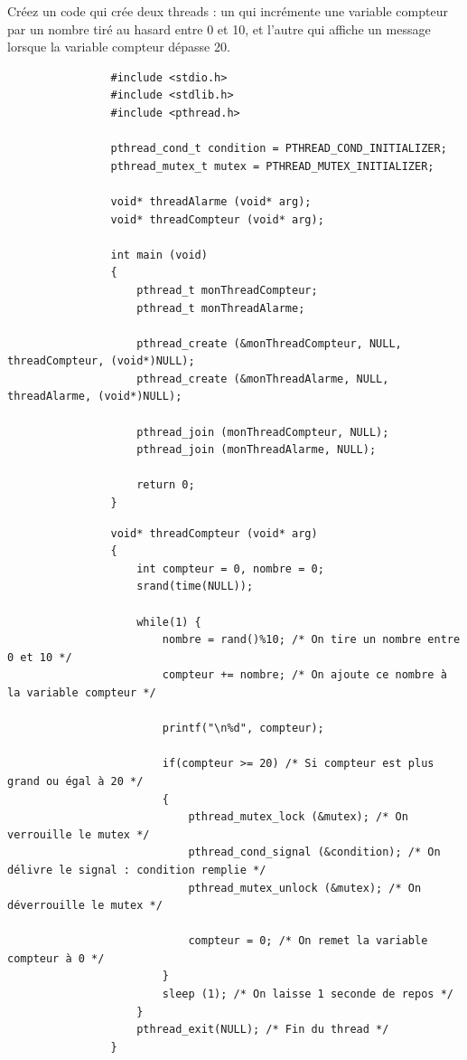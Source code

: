 		\begin{frame}
			Créez un code qui crée deux threads : un qui incrémente une variable compteur par un nombre tiré au hasard entre 0 et 10, et l'autre qui affiche un message lorsque la variable compteur dépasse 20.
		\end{frame} 
		
		\begin{frame}[containsverbatim]
			\begin{lstlisting}
				#include <stdio.h>
				#include <stdlib.h>
				#include <pthread.h>

				pthread_cond_t condition = PTHREAD_COND_INITIALIZER;
				pthread_mutex_t mutex = PTHREAD_MUTEX_INITIALIZER;

				void* threadAlarme (void* arg);
				void* threadCompteur (void* arg);

				int main (void)
				{
					pthread_t monThreadCompteur;
					pthread_t monThreadAlarme;

					pthread_create (&monThreadCompteur, NULL, threadCompteur, (void*)NULL);
					pthread_create (&monThreadAlarme, NULL, threadAlarme, (void*)NULL);

					pthread_join (monThreadCompteur, NULL);
					pthread_join (monThreadAlarme, NULL);

					return 0;
				}
			\end{lstlisting}
		\end{frame}
		
		\begin{frame}[containsverbatim]
			\begin{lstlisting}
				void* threadCompteur (void* arg)
				{
					int compteur = 0, nombre = 0;
					srand(time(NULL));

					while(1) {
						nombre = rand()%10; /* On tire un nombre entre 0 et 10 */
						compteur += nombre; /* On ajoute ce nombre à la variable compteur */

						printf("\n%d", compteur);
						
						if(compteur >= 20) /* Si compteur est plus grand ou égal à 20 */
						{
							pthread_mutex_lock (&mutex); /* On verrouille le mutex */
							pthread_cond_signal (&condition); /* On délivre le signal : condition remplie */
							pthread_mutex_unlock (&mutex); /* On déverrouille le mutex */

							compteur = 0; /* On remet la variable compteur à 0 */
						}
						sleep (1); /* On laisse 1 seconde de repos */
					}
					pthread_exit(NULL); /* Fin du thread */
				}
			\end{lstlisting}
		\end{frame}
		
